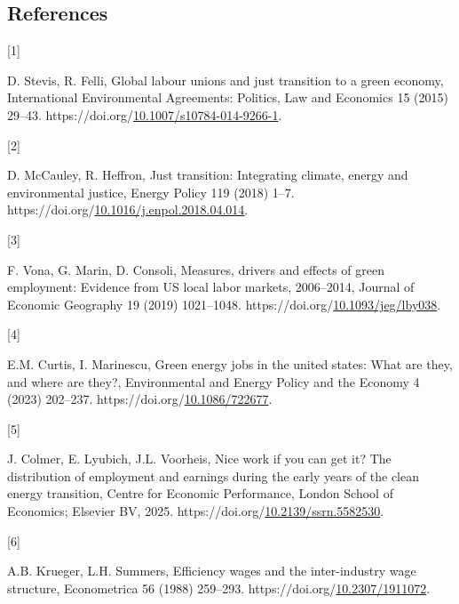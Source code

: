 \documentclass[
  11pt,
]{article}
\newlength{\cslhangindent}
\newlength{\csllabelwidth}
\newenvironment{CSLReferences}[2] %
 {\begin{list}{}{%
  \setlength{\itemindent}{0pt}
  \setlength{\leftmargin}{0pt}
  \setlength{\parsep}{0pt}
  \ifodd #1
   \setlength{\leftmargin}{\cslhangindent}
   \setlength{\itemindent}{-1\cslhangindent}
  \fi
  \setlength{\itemsep}{#2\baselineskip}}}
 {\end{list}}
\newcommand{\CSLLeftMargin}[1]{\parbox[t]{\csllabelwidth}{\strut#1\strut}}
\newcommand{\CSLRightInline}[1]{\parbox[t]{\linewidth - \csllabelwidth}{\strut#1\strut}}
\begin{document}
\subsection{References}\label{references}

\protect{}\label{refs}
\begin{CSLReferences}{0}{0}
\CSLLeftMargin{{[}1{]} }%
\CSLRightInline{D. Stevis, R. Felli, Global labour unions and just
transition to a green economy, International Environmental Agreements:
Politics, Law and Economics 15 (2015) 29--43.
https://doi.org/\href{https://doi.org/10.1007/s10784-014-9266-1}{10.1007/s10784-014-9266-1}.}

\CSLLeftMargin{{[}2{]} }%
\CSLRightInline{D. McCauley, R. Heffron, Just transition: Integrating
climate, energy and environmental justice, Energy Policy 119 (2018)
1--7.
https://doi.org/\href{https://doi.org/10.1016/j.enpol.2018.04.014}{10.1016/j.enpol.2018.04.014}.}

\CSLLeftMargin{{[}3{]} }%
\CSLRightInline{F. Vona, G. Marin, D. Consoli, Measures, drivers and
effects of green employment: Evidence from US local labor markets,
2006--2014, Journal of Economic Geography 19 (2019) 1021--1048.
https://doi.org/\href{https://doi.org/10.1093/jeg/lby038}{10.1093/jeg/lby038}.}

\CSLLeftMargin{{[}4{]} }%
\CSLRightInline{E.M. Curtis, I. Marinescu, Green energy jobs in the
united states: What are they, and where are they?, Environmental and
Energy Policy and the Economy 4 (2023) 202--237.
https://doi.org/\href{https://doi.org/10.1086/722677}{10.1086/722677}.}

\CSLLeftMargin{{[}5{]} }%
\CSLRightInline{J. Colmer, E. Lyubich, J.L. Voorheis, Nice work if you
can get it? The distribution of employment and earnings during the early
years of the clean energy transition, Centre for Economic Performance,
London School of Economics; Elsevier BV, 2025.
https://doi.org/\href{https://doi.org/10.2139/ssrn.5582530}{10.2139/ssrn.5582530}.}

\CSLLeftMargin{{[}6{]} }%
\CSLRightInline{A.B. Krueger, L.H. Summers, Efficiency wages and the
inter-industry wage structure, Econometrica 56 (1988) 259--293.
https://doi.org/\href{https://doi.org/10.2307/1911072}{10.2307/1911072}.}


\end{CSLReferences}
\end{document}
